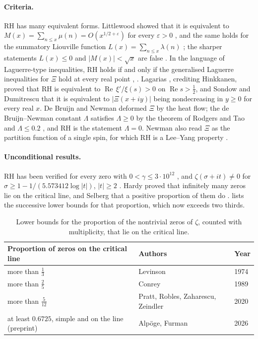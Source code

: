 \documentclass[11pt]{article}
\theoremstyle{definition}\newtheorem{definition}[theorem]{Definition}
\theoremstyle{remark}\newtheorem{remark}[theorem]{Remark}
\renewcommand{\Re}{\operatorname{Re}}\renewcommand{\Im}{\operatorname{Im}}
\begin{document}
\paragraph{Criteria.} RH has many equivalent forms. Littlewood showed that it is equivalent to $M(x)=\sum_{n\le x}\mu(n)=O(x^{1/2+\varepsilon})$ for every $\varepsilon>0$ \cite{Littlewood}, and the same holds for the summatory Liouville function $L(x)=\sum_{n\le x}\lambda(n)$ \cite{Borwein}; the sharper statements $L(x)\le0$ and $|M(x)|<\sqrt x$ are false \cite{Haselgrove,Tanaka,OdlyzkoteRiele}. In the language of Laguerre-type inequalities, RH holds if and only if the generalised Laguerre inequalities for $\Xi$ hold at every real point \cite{Patrick}, \cite[Thm.~2.9]{CV}. Lagarias \cite{Lagarias}, crediting Hinkkanen, proved that RH is equivalent to $\Re\,\xi'/\xi(s)>0$ on $\Re s>\frac12$, and Sondow and Dumitrescu \cite{SD} that it is equivalent to $|\Xi(x+iy)|$ being nondecreasing in $y\ge0$ for every real $x$. De Bruijn \cite{deBruijn} and Newman \cite{Newman76} deformed $\Xi$ by the heat flow; the de Bruijn--Newman constant $\Lambda$ satisfies $\Lambda\ge0$ by the theorem of Rodgers and Tao \cite{RT} and $\Lambda\le0.2$ \cite[Cor.~2]{PT}, and RH is the statement $\Lambda=0$. Newman also read $\Xi$ as the partition function of a single spin, for which RH is a Lee--Yang property \cite{Newman74,Newman76,NewmanWu}.

\paragraph{Unconditional results.} RH has been verified for every zero with $0<\gamma\le3\cdot10^{12}$ \cite{PT}, and $\zeta(\sigma+it)\ne0$ for $\sigma\ge1-1/(5.573412\log|t|)$, $|t|\ge2$ \cite{MT}. Hardy proved that infinitely many zeros lie on the critical line, and Selberg that a positive proportion of them do \cite[Ch.~X]{Titchmarsh}.  lists the successive lower bounds for that proportion, which now exceeds two thirds.
\begin{table}[h]\centering\small
\begin{tabular}{@{}lll@{}}\toprule
Proportion of zeros on the critical line & Authors & Year\\\midrule
more than $\frac13$ & Levinson \cite{Levinson} & 1974\\
more than $\frac25$ & Conrey \cite{Conrey} & 1989\\
more than $\frac5{12}$ & Pratt, Robles, Zaharescu, Zeindler \cite{PRZZ} & 2020\\
at least $0.6725$, simple and on the line (preprint) & Alp\"oge, Furman \cite{AF} & 2026\\\bottomrule
\end{tabular}
\caption{Lower bounds for the proportion of the nontrivial zeros of $\zeta$, counted with multiplicity, that lie on the critical line.}\label{tab:prop}
\end{table}
\end{document}
